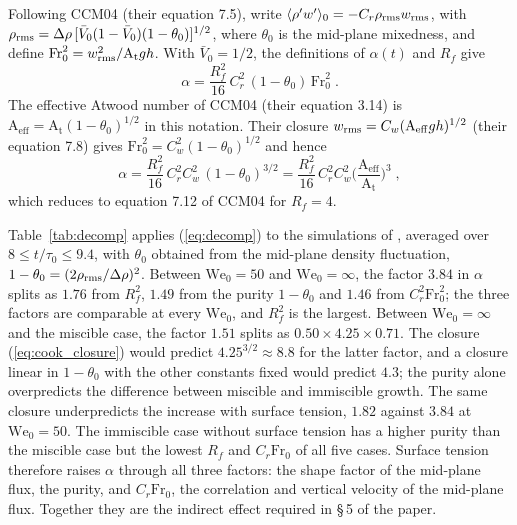 \documentclass[11pt]{article}
\newcommand{\avg}[1]{\langle #1\rangle}
\newcommand{\At}{\mathrm{A_t}}
\newcommand{\We}{\mathrm{We}_0}
\begin{document}
Following CCM04 (their equation 7.5), write $\avg{\rho' w'}_0 = -C_r \rho_{\rm rms} w_{\rm rms}$, with $\rho_{\rm rms} = \Delta \rho \,[\bar V_0 (1 - \bar V_0)(1 - \theta_0)]^{1/2}$, where $\theta_0$ is the mid-plane mixedness, and define $\mathrm{Fr}_0^2 = w_{\rm rms}^2/\At g h$. With $\bar V_0 = 1/2$, the definitions of $\alpha(t)$ and $R_f$ give
\begin{equation}
  \alpha = \frac{R_f^2}{16} \, C_r^2 \,(1 - \theta_0) \, \mathrm{Fr}_0^2 \;.
  \label{eq:decomp}
\end{equation}
The effective Atwood number of CCM04 (their equation 3.14) is $\mathrm{A}_\mathrm{eff} = \At (1 - \theta_0)^{1/2}$ in this notation. Their closure $w_{\rm rms} = C_w (\mathrm{A}_\mathrm{eff} g h)^{1/2}$ (their equation 7.8) gives $\mathrm{Fr}_0^2 = C_w^2 (1 - \theta_0)^{1/2}$ and hence
\begin{equation}
  \alpha = \frac{R_f^2}{16} \, C_r^2 C_w^2 \,(1 - \theta_0)^{3/2} = \frac{R_f^2}{16} \, C_r^2 C_w^2 \Big(\frac{\mathrm{A}_\mathrm{eff}}{\At}\Big)^3 \;,
  \label{eq:cook_closure}
\end{equation}
which reduces to equation 7.12 of CCM04 for $R_f = 4$.

Table~\ref{tab:decomp} applies (\ref{eq:decomp}) to the simulations of \citet{Walker2027_1,Walker2027_2}, averaged over $8 \le t/\tau_0 \le 9.4$, with $\theta_0$ obtained from the mid-plane density fluctuation, $1 - \theta_0 = (2 \rho_{\rm rms}/\Delta \rho)^2$. Between $\We = 50$ and $\We = \infty$, the factor $3.84$ in $\alpha$ splits as $1.76$ from $R_f^2$, $1.49$ from the purity $1 - \theta_0$ and $1.46$ from $C_r^2 \mathrm{Fr}_0^2$; the three factors are comparable at every $\We$, and $R_f^2$ is the largest. Between $\We = \infty$ and the miscible case, the factor $1.51$ splits as $0.50 \times 4.25 \times 0.71$. The closure (\ref{eq:cook_closure}) would predict $4.25^{3/2} \approx 8.8$ for the latter factor, and a closure linear in $1 - \theta_0$ with the other constants fixed would predict $4.3$; the purity alone overpredicts the difference between miscible and immiscible growth. The same closure underpredicts the increase with surface tension, $1.82$ against $3.84$ at $\We = 50$. The immiscible case without surface tension has a higher purity than the miscible case but the lowest $R_f$ and $C_r \mathrm{Fr}_0$ of all five cases. Surface tension therefore raises $\alpha$ through all three factors: the shape factor of the mid-plane flux, the purity, and $C_r \mathrm{Fr}_0$, the correlation and vertical velocity of the mid-plane flux. Together they are the indirect effect required in \S\,5 of the paper.
\end{document}
